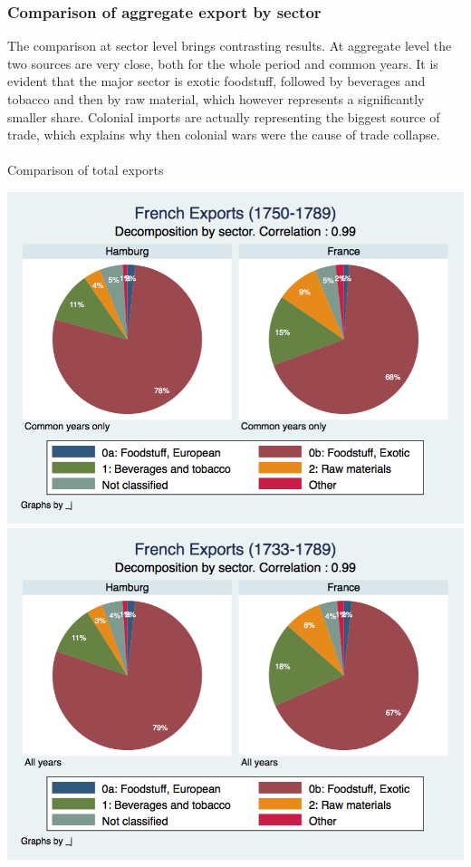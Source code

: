 \documentclass[12pt,a4paper,titlepage]{article}
\begin{document}
\subsubsection{Comparison of aggregate export by sector}
The comparison at sector level brings contrasting results. At aggregate level the two sources are very close, both for the whole period and common years. It is evident that the major sector is exotic foodstuff, followed by beverages and tobacco and then by raw material, which however represents a significantly smaller share. Colonial imports are actually representing the biggest source of trade, which explains why then colonial wars were the cause of trade collapse. \\~\\
\caption{Comparison of total exports}
\includegraphics[scale=.28]{commonyears_sector.png}
\includegraphics[scale=.28]{allyears_sector.png}
\end{document}
